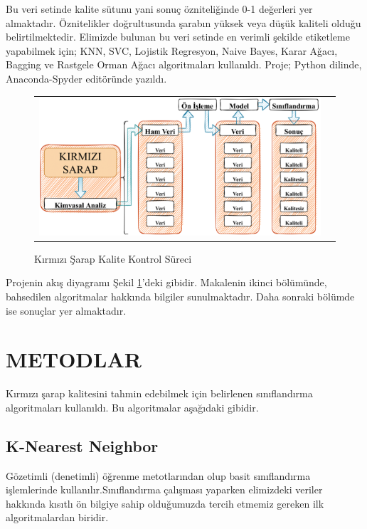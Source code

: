 \documentclass[conference]{IEEEtran}
\begin{document}
\quad Bu veri setinde kalite sütunu yani sonuç özniteliğinde 0-1 değerleri yer almaktadır. Öznitelikler doğrultusunda şarabın yüksek veya düşük kaliteli olduğu belirtilmektedir. Elimizde bulunan bu veri setinde en verimli şekilde etiketleme yapabilmek için; KNN, SVC, Lojistik Regresyon, Naive Bayes, Karar Ağacı, Bagging ve Rastgele Orman Ağacı algoritmaları kullanıldı. Proje; Python dilinde, Anaconda-Spyder editöründe yazıldı.
\pagebreak
\begin{figure}[!h]
	\centering%
	\begin{center}
		\begin{tabular}{cc}%
			\includegraphics[scale=0.2]{pictures/pic_01.png}&%
		\end{tabular}%
	\end{center}
	\caption{Kırmızı Şarap Kalite Kontrol Süreci}%
	\label{fig:01}
\end{figure}

Projenin akış diyagramı Şekil \ref{fig:01}'deki gibidir. Makalenin ikinci bölümünde, bahsedilen algoritmalar hakkında bilgiler sunulmaktadır. Daha sonraki bölümde ise sonuçlar yer almaktadır.

\section{\textbf{METODLAR}}
\quad Kırmızı şarap kalitesini tahmin edebilmek için belirlenen sınıflandırma algoritmaları kullanıldı. Bu algoritmalar aşağıdaki gibidir.
\subsection{\textbf{K-Nearest Neighbor}}
\quad Gözetimli (denetimli) öğrenme metotlarından olup basit sınıflandırma işlemlerinde kullanılır\cite{8}\cite{9}.Sınıflandırma çalışması yaparken elimizdeki veriler hakkında kısıtlı ön bilgiye sahip olduğumuzda tercih etmemiz gereken ilk algoritmalardan biridir\cite{8}.
\end{document}
